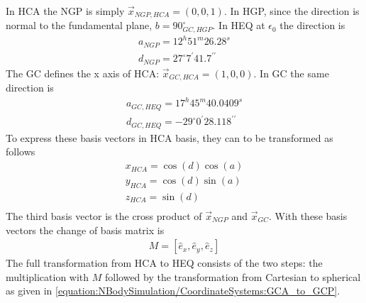 \documentclass[letterpaper,10pt,english]{sphinxmanual}
\begin{document}
\sphinxAtStartPar
In HCA the NGP is simply \(\vec{x}_{NGP,HCA}=(0, 0, 1)\).
In HGP, since the direction is normal to the fundamental plane, \(b=90^{\circ}_{GC,HGP}\).
In HEQ at \(\epsilon_0\) the direction is
\begin{equation*}
\begin{split}a_{NGP} = 12^h51^m26.28^s \\
d_{NGP} = 27^{\circ}7^\prime41.7^{\prime\prime}\end{split}
\end{equation*}
\sphinxAtStartPar
The GC defines the x axis of HCA: \(\vec{x}_{GC,HCA}=(1, 0, 0)\). In GC the same direction is
\begin{equation*}
\begin{split}a_{GC,HEQ} = 17^h45^m40.0409^s \\
d_{GC,HEQ} = -29^{\circ}0^\prime28.118^{\prime\prime}\end{split}
\end{equation*}
\sphinxAtStartPar
To express these basis vectors in HCA basis, they can to be transformed as follows
\begin{equation*}
\begin{split}x_{HCA} = \cos(d)\cos(a) \\
y_{HCA} = \cos(d)\sin(a) \\
z_{HCA} = \sin(d) \\\end{split}
\end{equation*}
\sphinxAtStartPar
The third basis vector is the cross product of \(\vec{x}_{NGP}\) and \(\vec{x}_{GC}\).
With these basis vectors the change of basis matrix is
\begin{equation*}
\begin{split}M = \left [\hat{e}_x,\hat{e}_y,\hat{e}_z\right ]\end{split}
\end{equation*}
\sphinxAtStartPar
The full transformation from HCA to HEQ consists of the two steps: the multiplication with \(M\) followed by
the transformation from Cartesian to spherical as given in \eqref{equation:NBodySimulation/CoordinateSystems:GCA_to_GCP}.
\end{document}
